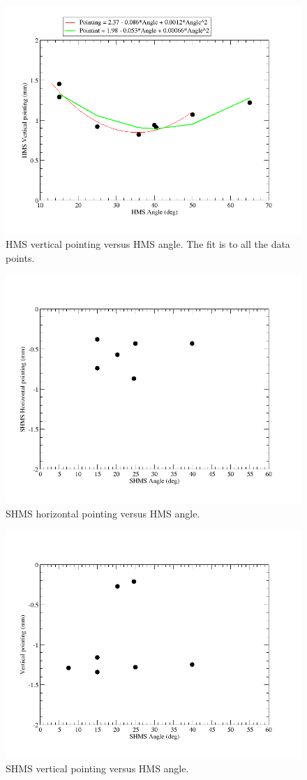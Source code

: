 \documentclass[]{article}
\begin{document}
		\begin{figure}[h]	
			\begin{center}
				\includegraphics[width=0.8\columnwidth]{hms_vertical_pointing.png}
			\end{center}
			\caption{HMS vertical pointing versus HMS angle. The fit is to all the data points. }
			\label{fig:hms_vert_pointing}
		\end{figure}
		
		\begin{figure}[h]	
			\begin{center}
				\includegraphics[width=0.8\columnwidth]{shms_horizontal_pointing.png}
			\end{center}
			\caption{SHMS horizontal pointing versus HMS angle.  }
			\label{fig:shms_horz_pointing}
		\end{figure}
		
		\begin{figure}[h]	
			\begin{center}
				\includegraphics[width=0.8\columnwidth]{shms_vertical_pointing.png}
			\end{center}
			\caption{SHMS vertical pointing versus HMS angle.  }
			\label{fig:shms_vert_pointing}
		\end{figure}
		
		
			
\end{document}
